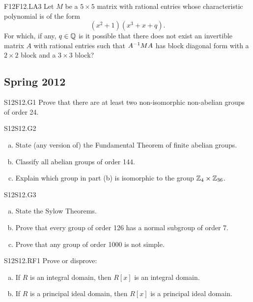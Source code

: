 \documentclass[../AlgebraQualSolutions.tex]{subfiles}
\begin{document}
\begin{prob}{F12}{F12.LA3}
Let $M$ be a $5 \times 5$ matrix with rational entries whose characteristic polynomial is of the form
	\[(x^2+1)(x^3+x+q).\]
For which, if any, $q \in \mathbb{Q}$ is it possible that there does not exist an invertible matrix $A$ with rational entries such that $A^{-1} M A$ has block diagonal form with a $2 \times 2$ block and a $3 \times 3$ block?
\end{prob}

\subsection{Spring 2012}


\begin{prob}{S12}{S12.G1}
	Prove that there are at least two non-isomorphic non-abelian groups of order 24.
\end{prob}

\begin{prob}{S12}{S12.G2}
	\begin{enumerate}[(a)]
		\item State (any version of) the Fundamental Theorem of finite abelian groups.
		\item Classify all abelian groups of order 144.
		\item Explain which group in part (b) is isomorphic to the group $\mathbb{Z}_4 \times \mathbb{Z}_{36}$.
	\end{enumerate}
\end{prob}

\begin{prob}{S12}{S12.G3}
	\begin{enumerate}[(a)]
		\item State the Sylow Theorems.
		\item Prove that every group of order 126 has a normal subgroup of order 7.
		\item Prove that any group of order 1000 is not simple.
	\end{enumerate}
\end{prob}

\begin{prob}{S12}{S12.RF1}
	Prove or disprove:

	\begin{enumerate}[(a)]
		\item If $R$ is an integral domain, then $R[x]$ is an integral domain.
		\item If $R$ is a principal ideal domain, then $R[x]$ is a principal ideal domain.
	\end{enumerate}
\end{prob}
\end{document}
